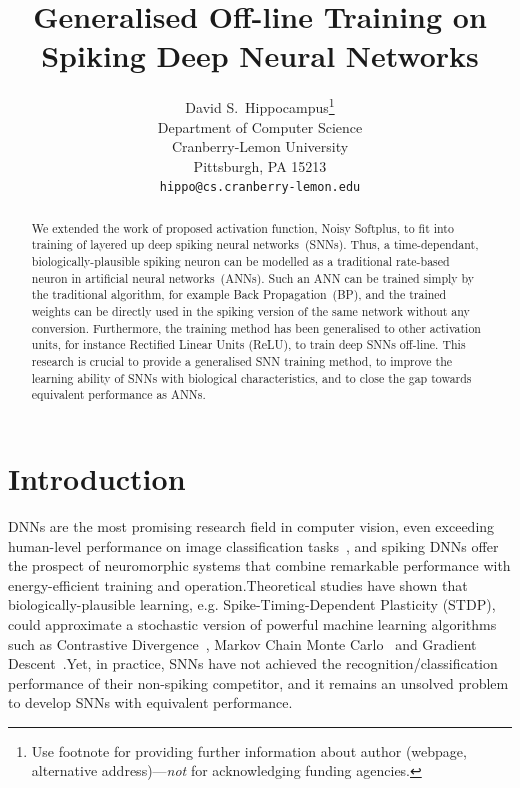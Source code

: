 \documentclass{article}
\title{Generalised Off-line Training on\\ Spiking Deep Neural Networks}
\author{
  David S.~Hippocampus\thanks{Use footnote for providing further
    information about author (webpage, alternative
    address)---\emph{not} for acknowledging funding agencies.} \\
  Department of Computer Science\\
  Cranberry-Lemon University\\
  Pittsburgh, PA 15213 \\
  \texttt{hippo@cs.cranberry-lemon.edu} \\
}
\begin{document}

\maketitle

\begin{abstract}
  We extended the work of proposed activation function, Noisy Softplus, to fit into training of layered up deep spiking neural networks~(SNNs).
  Thus, a time-dependant, biologically-plausible spiking neuron can be modelled as a traditional rate-based neuron in artificial neural networks~(ANNs).
  Such an ANN can be trained simply by the traditional algorithm, for example Back Propagation~(BP), and the trained weights can be directly used in the spiking version of the same network without any conversion.
  Furthermore, the training method has been generalised to other activation units, for instance Rectified Linear Units (ReLU), to train deep SNNs off-line.
  This research is crucial to provide a generalised SNN training method, to improve the learning ability of SNNs with biological characteristics, and to close the gap towards equivalent performance as ANNs.
 
\end{abstract}

\section{Introduction}
DNNs are the most promising research field in computer vision, even exceeding human-level performance on image classification tasks~\cite{he2015delving}, and spiking DNNs offer the prospect of neuromorphic systems that combine remarkable performance with energy-efficient training and operation.Theoretical studies have shown that biologically-plausible learning, e.g. Spike-Timing-Dependent Plasticity (STDP), could approximate a stochastic version of powerful machine learning algorithms such as 
Contrastive Divergence~\cite{neftci2013event}, Markov Chain Monte Carlo~\cite{buesing2011neural} and Gradient Descent~\cite{o2016deep}.Yet, in practice, SNNs have not achieved the recognition/classification performance of their non-spiking competitor, and it remains an unsolved problem to develop SNNs with equivalent performance.

\end{document}
